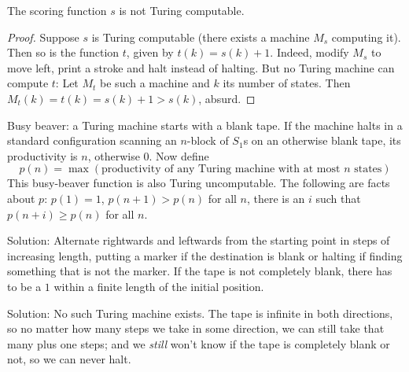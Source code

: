 \begin{theorem}
  The scoring function $s$ is not Turing computable.
\end{theorem}
\begin{proof}
  Suppose $s$ is Turing computable (there exists a machine $M_s$ computing it).
  Then so is the function $t$, given by $t(k) = s(k) + 1$.
  Indeed, modify $M_s$ to move left, print a stroke and halt instead of halting.
  But no Turing machine can compute $t$: Let $M_t$ be such a machine and $k$ its number of states.
  Then $M_t(k) = t(k) = s(k) + 1 > s(k)$, absurd.
\end{proof}

Busy beaver: a Turing machine starts with a blank tape.
If the machine halts in a standard configuration scanning an $n$-block of $S_1$s on an otherwise blank tape, its productivity is $n$, otherwise $0$.
Now define
\begin{equation*}
  p(n) = \max \left(\text{productivity of any Turing machine with at most $n$ states}\right)
\end{equation*}
This busy-beaver function is also Turing uncomputable.
The following are facts about $p$: $p(1) = 1$, $p(n+1)>p(n)$ for all $n$, there is an $i$ such that $p(n+i) \ge p(n)$ for all $n$.

\begin{exercise}[4.1]
  Solution: Alternate rightwards and leftwards from the starting point in steps of increasing length, putting a marker if the destination is blank or halting if finding something that is not the marker.
  If the tape is not completely blank, there has to be a $1$ within a finite length of the initial position.
\end{exercise}

\begin{exercise}[4.2]
  Solution: No such Turing machine exists.
  The tape is infinite in both directions, so no matter how many steps we take in some direction, we can still take that many plus one steps; and we \emph{still} won't know if the tape is completely blank or not, so we can never halt.
\end{exercise}

